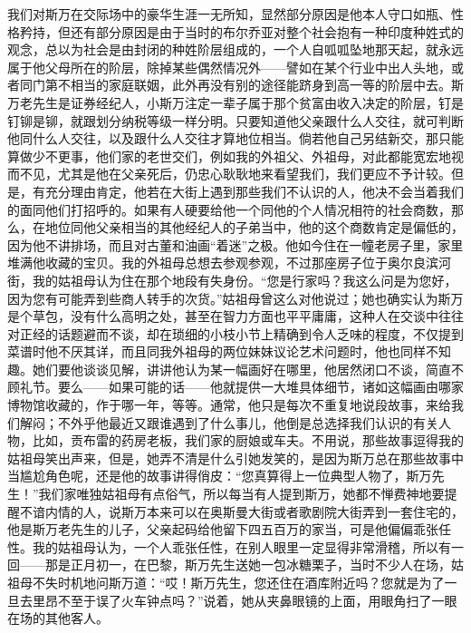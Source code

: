 \par 我们对斯万在交际场中的豪华生涯一无所知，显然部分原因是他本人守口如瓶、性格矜持，但还有部分原因是由于当时的布尔乔亚对整个社会抱有一种印度种姓式的观念，总以为社会是由封闭的种姓阶层组成的，一个人自呱呱坠地那天起，就永远属于他父母所在的阶层，除掉某些偶然情况外——譬如在某个行业中出人头地，或者同门第不相当的家庭联姻，此外再没有别的途径能跻身到高一等的阶层中去。斯万老先生是证券经纪人，小斯万注定一辈子属于那个贫富由收入决定的阶层，钉是钉铆是铆，就跟划分纳税等级一样分明。只要知道他父亲跟什么人交往，就可判断他同什么人交往，以及跟什么人交往才算地位相当。倘若他自己另结新交，那只能算做少不更事，他们家的老世交们，例如我的外祖父、外祖母，对此都能宽宏地视而不见，尤其是他在父亲死后，仍忠心耿耿地来看望我们，我们更应不予计较。但是，有充分理由肯定，他若在大街上遇到那些我们不认识的人，他决不会当着我们的面同他们打招呼的。如果有人硬要给他一个同他的个人情况相符的社会商数，那么，在地位同他父亲相当的其他经纪人的子弟当中，他的这个商数肯定是偏低的，因为他不讲排场，而且对古董和油画“着迷”之极。他如今住在一幢老房子里，家里堆满他收藏的宝贝。我的外祖母总想去参观参观，不过那座房子位于奥尔良滨河街，我的姑祖母认为住在那个地段有失身份。“您是行家吗？我这么问是为您好，因为您有可能弄到些商人转手的次货。”姑祖母曾这么对他说过；她也确实认为斯万是个草包，没有什么高明之处，甚至在智力方面也平平庸庸，这种人在交谈中往往对正经的话题避而不谈，却在琐细的小枝小节上精确到令人乏味的程度，不仅提到菜谱时他不厌其详，而且同我外祖母的两位妹妹议论艺术问题时，他也同样不知趣。她们要他谈谈见解，讲讲他认为某一幅画好在哪里，他居然闭口不谈，简直不顾礼节。要么——如果可能的话——他就提供一大堆具体细节，诸如这幅画由哪家博物馆收藏的，作于哪一年，等等。通常，他只是每次不重复地说段故事，来给我们解闷；不外乎他最近又跟谁遇到了什么事儿，他倒是总选择我们认识的有关人物，比如，贡布雷的药房老板，我们家的厨娘或车夫。不用说，那些故事逗得我的姑祖母笑出声来，但是，她弄不清是什么引她发笑的，是因为斯万总在那些故事中当尴尬角色呢，还是他的故事讲得俏皮：“您真算得上一位典型人物了，斯万先生！”我们家唯独姑祖母有点俗气，所以每当有人提到斯万，她都不惮费神地要提醒不谙内情的人，说斯万本来可以在奥斯曼大街或者歌剧院大街弄到一套住宅的，他是斯万老先生的儿子，父亲起码给他留下四五百万的家当，可是他偏偏乖张任性。我的姑祖母认为，一个人乖张任性，在别人眼里一定显得非常滑稽，所以有一回——那是正月初一，在巴黎，斯万先生送她一包冰糖栗子，当时不少人在场，姑祖母不失时机地问斯万道：“哎！斯万先生，您还住在酒库附近吗？您就是为了一旦去里昂不至于误了火车钟点吗？”说着，她从夹鼻眼镜的上面，用眼角扫了一眼在场的其他客人。
